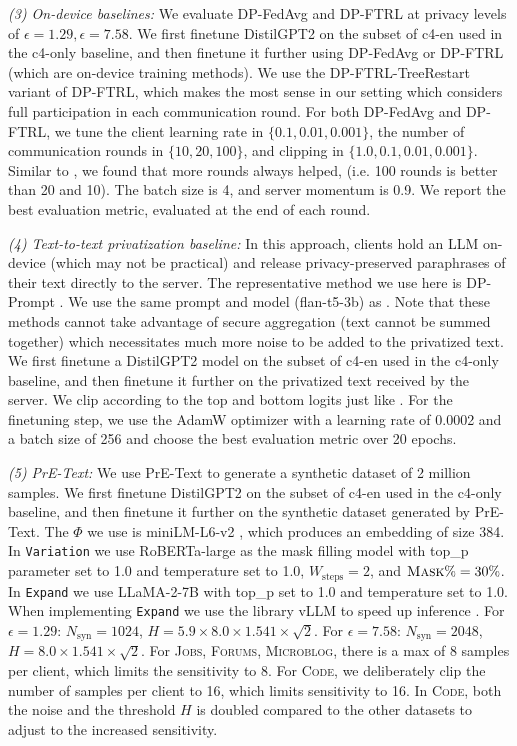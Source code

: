 \documentclass{article}
\theoremstyle{plain}
\theoremstyle{definition}
\theoremstyle{remark}
\begin{document}
\textit{(3) On-device baselines:} We evaluate DP-FedAvg \citep{mcmahan2017learning} and DP-FTRL \citep{kairouz2021practical} at privacy levels of $\epsilon=1.29, \epsilon=7.58$. We first finetune DistilGPT2 on the subset of c4-en used in the c4-only baseline, and then finetune it further using DP-FedAvg or DP-FTRL (which are on-device training methods). We use the DP-FTRL-TreeRestart variant of DP-FTRL, which makes the most sense in our setting which considers full participation in each communication round. For both DP-FedAvg and DP-FTRL, we tune the client learning rate in $\{0.1, 0.01, 0.001\}$, the number of communication rounds in $\{10,20,100\}$, and clipping in $\{1.0, 0.1, 0.01, 0.001\}$. Similar to \citep{kairouz2021practical}, we found that more rounds always helped, (i.e. 100 rounds is better than 20 and 10). The batch size is 4, and server momentum is 0.9. We report the best evaluation metric, evaluated at the end of each round.

\textit{(4) Text-to-text privatization baseline:} In this approach, clients hold an LLM on-device (which may not be practical) and release privacy-preserved paraphrases of their text directly to the server. The representative method we use here is DP-Prompt \citep{utpala-etal-2023-locally}. We use the same prompt and model (flan-t5-3b) as \citet{utpala-etal-2023-locally}. Note that these methods cannot take advantage of secure aggregation (text cannot be summed together) which necessitates much more noise to be added to the privatized text. We first finetune a DistilGPT2 model on the subset of c4-en used in the c4-only baseline, and then finetune it further on the privatized text received by the server. We clip according to the top and bottom logits just like \citet{utpala-etal-2023-locally}. For the finetuning step, we use the AdamW optimizer with a learning rate of 0.0002 and a batch size of 256 and choose the best evaluation metric over 20 epochs.

\textit{(5) PrE-Text:} We use PrE-Text to generate a synthetic dataset of 2 million samples. We first finetune DistilGPT2 on the subset of c4-en used in the c4-only baseline, and then finetune it further on the synthetic dataset generated by PrE-Text. The $\Phi$ we use is miniLM-L6-v2 \citep{reimers-2019-sentence-bert}, which produces an embedding of size 384. In \texttt{Variation} we use RoBERTa-large as the mask filling model with top\_p parameter set to 1.0 and temperature set to 1.0, $W_{\text{steps}}=2$, and $\textsc{Mask}\% = 30\%$.  In \texttt{Expand} we use LLaMA-2-7B with top\_p set to 1.0 and temperature set to 1.0.  When implementing \texttt{Expand} we use the library vLLM to speed up inference \citep{kwon2023efficient}. For $\epsilon=1.29$: $N_{\text{syn}}=1024$, $H=5.9 \times 8.0 \times 1.541 \times \sqrt{2}$. For $\epsilon=7.58$: $N_{\text{syn}}=2048$, $H=8.0 \times 1.541 \times \sqrt{2}$. For \textsc{Jobs}, \textsc{Forums}, \textsc{Microblog}, there is a max of 8 samples per client, which limits the sensitivity to 8. For \textsc{Code}, we deliberately clip the number of samples per client to 16, which limits sensitivity to 16. In \textsc{Code}, both the noise and the threshold $H$ is doubled compared to the other datasets to adjust to the increased sensitivity.




\end{document}
